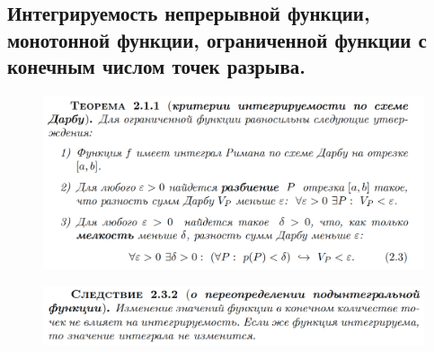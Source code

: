 \documentclass{article}
\begin{document}
\subsection{Интегрируемость непрерывной функции, монотонной функции, ограниченной функции с конечным числом точек разрыва.}
\begin{figure}[h!]
    \centering
    \includegraphics[width=\textwidth]{60.png}
    \vspace{-1cm}
\end{figure}
\begin{figure}[h!]
    \centering
    \includegraphics[width=\textwidth]{67.png}
    \vspace{-1cm}
\end{figure}
\newpage
\end{document}
